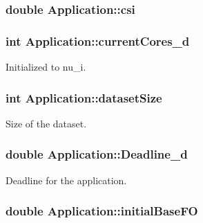 \hypertarget{classApplication_a20adc533c6b6147342b3f60dc0fbd9bc}{
\subsubsection[{csi}]{\setlength{\rightskip}{0pt plus 5cm}double Application\-::csi}}\label{classApplication_a20adc533c6b6147342b3f60dc0fbd9bc}
\hypertarget{classApplication_adee341a84a5389dfd4d16e7f8e697190}{
\subsubsection[{current\-Cores\-\_\-d}]{\setlength{\rightskip}{0pt plus 5cm}int Application\-::current\-Cores\-\_\-d}}\label{classApplication_adee341a84a5389dfd4d16e7f8e697190}


Initialized to nu\-\_\-i. 

\hypertarget{classApplication_aaa155e818d807f585d83ecacf4abfe42}{
\subsubsection[{dataset\-Size}]{\setlength{\rightskip}{0pt plus 5cm}int Application\-::dataset\-Size}}\label{classApplication_aaa155e818d807f585d83ecacf4abfe42}


Size of the dataset. 

\hypertarget{classApplication_a2a989ae288a74ee5250b5acf449c864a}{
\subsubsection[{Deadline\-\_\-d}]{\setlength{\rightskip}{0pt plus 5cm}double Application\-::\-Deadline\-\_\-d}}\label{classApplication_a2a989ae288a74ee5250b5acf449c864a}


Deadline for the application. 

\hypertarget{classApplication_a95fd54cbed658fb23ce27939666c91d2}{
\subsubsection[{initial\-Base\-F\-O}]{\setlength{\rightskip}{0pt plus 5cm}double Application\-::initial\-Base\-F\-O}}\label{classApplication_a95fd54cbed658fb23ce27939666c91d2}


